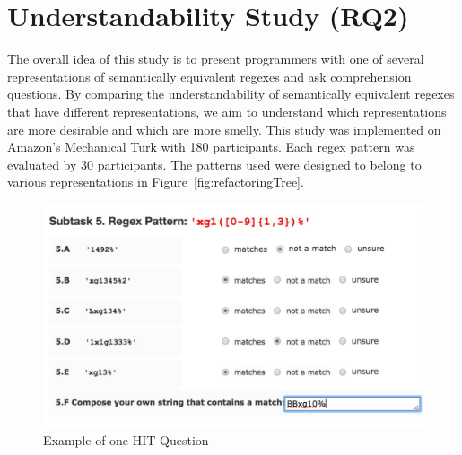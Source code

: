 

\section{Understandability Study (RQ2)}
\label{sec:understandability}
The overall idea of this study  is to present  programmers with one of several representations of semantically equivalent regexes and ask comprehension questions. By comparing the understandability of semantically equivalent regexes that have different representations, we aim to understand which representations  are more desirable and which are more smelly.
This study was  implemented on Amazon's Mechanical Turk with 180 participants.  Each regex pattern was evaluated by 30 participants.
The patterns used were designed to belong to various representations in Figure~\ref{fig:refactoringTree}.



\begin{figure}[tb]
\centering
\includegraphics[width=0.8\columnwidth]{illustrations/ExampleQuestion}
\vspace{-12pt}
\caption{Example of one HIT Question}
\vspace{-6pt}
\label{fig:exampleQuestion}
\end{figure}



